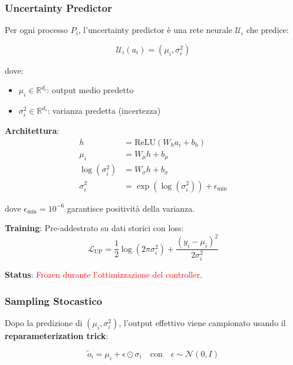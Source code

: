 \documentclass[11pt,a4paper]{article}
\begin{document}
\subsubsection{Uncertainty Predictor}

Per ogni processo $P_i$, l'uncertainty predictor è una rete neurale $\mathcal{U}_i$ che predice:

\begin{equation}
\mathcal{U}_i(a_i) = (\mu_i, \sigma_i^2)
\end{equation}

dove:
\begin{itemize}
    \item $\mu_i \in \mathbb{R}^{d_i}$: output medio predetto
    \item $\sigma_i^2 \in \mathbb{R}^{d_i}$: varianza predetta (incertezza)
\end{itemize}

\textbf{Architettura}:
\begin{equation}
\begin{aligned}
h &= \text{ReLU}(W_h a_i + b_h) \\
\mu_i &= W_\mu h + b_\mu \\
\log(\sigma_i^2) &= W_\sigma h + b_\sigma \\
\sigma_i^2 &= \exp(\log(\sigma_i^2)) + \epsilon_{\min}
\end{aligned}
\end{equation}

dove $\epsilon_{\min} = 10^{-6}$ garantisce positività della varianza.

\textbf{Training}: Pre-addestrato su dati storici con loss:
\begin{equation}
\mathcal{L}_{\text{UP}} = \frac{1}{2}\log(2\pi\sigma_i^2) + \frac{(y_i - \mu_i)^2}{2\sigma_i^2}
\end{equation}

\textbf{Status}: \textcolor{red}{Frozen durante l'ottimizzazione del controller}.

\subsubsection{Sampling Stocastico}

Dopo la predizione di $(\mu_i, \sigma_i^2)$, l'output effettivo viene campionato usando il \textbf{reparameterization trick}:

\begin{equation}
\boxed{\tilde{o}_i = \mu_i + \epsilon \odot \sigma_i \quad \text{con} \quad \epsilon \sim \mathcal{N}(0, I)}
\end{equation}
\end{document}
